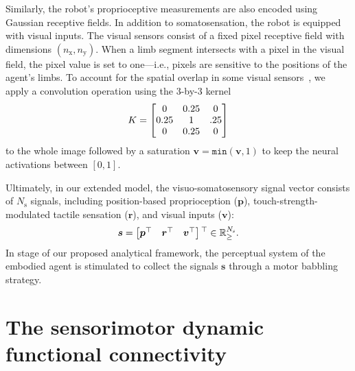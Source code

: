 Similarly, the robot's proprioceptive measurements are also encoded using Gaussian receptive fields. In addition to somatosensation, the robot is equipped with visual inputs. The visual sensors consist of a fixed pixel receptive field with dimensions $(n_\text{x}, n_\text{y})$. When a limb segment intersects with a pixel in the visual field, the pixel value is set to one---i.e., pixels are sensitive to the positions of the agent's limbs. To account for the spatial overlap in some visual sensors~\cite{Marshall2015}, we apply a convolution operation using the 3-by-3 kernel \[
\small
K = \begin{bmatrix} 
0 & 0.25 & 0 \\ 
0.25 & 1 & .25 \\ 
0 & 0.25 & 0 
\end{bmatrix}
\] to the whole image followed by a saturation $\bm{v}=\texttt{min}(\bm{v},1)$ to keep the neural activations between $[0,1]$.

Ultimately, in our extended model, the visuo-somatosensory signal vector consists of $N_\text{s}$ signals, including position-based proprioception ($\bm{p}$), touch-strength-modulated tactile sensation ($\bm{r}$), and visual inputs ($\bm{v}$):  
\begin{equation}
	\bm{s} = \begin{bmatrix}
		\bm{p}{^{\top}} & \bm{r}{^{\top}} & \bm{v}{^{\top}}
	\end{bmatrix}{^{\top}} \in \mathbb{R}^{N_\text{s}}_{\geq}.
\end{equation}
In stage  of our proposed analytical framework, the perceptual system of the embodied agent is stimulated to collect the signals $\bm{s}$ through a motor babbling strategy.

\section{The sensorimotor dynamic functional connectivity}

